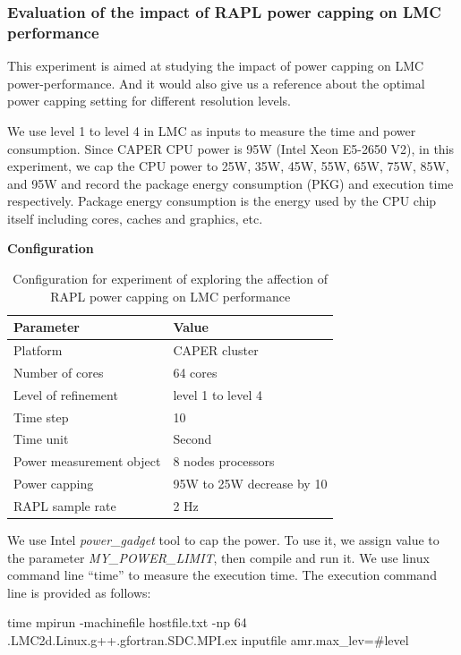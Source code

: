 \documentclass[10pt, conference, compsocconf]{IEEEtran}
\begin{document}
\subsubsection{Evaluation of the impact of RAPL power capping on LMC performance }
This experiment is aimed at studying the impact of power capping on LMC power-performance. And it would also give us a reference about the optimal power capping setting for different resolution levels. 



We use level 1 to level 4 in LMC as inputs to measure the time and power consumption. Since CAPER CPU power is 95W (Intel Xeon E5-2650 V2), in this experiment, we cap the CPU power to 25W, 35W, 45W, 55W, 65W, 75W, 85W, and 95W and record the package energy consumption (PKG) and execution time respectively. Package energy consumption is the energy used by the CPU chip itself including cores, caches and graphics, etc. 


\noindent
\textbf{Configuration}
\begin{table}[H]
\begin{center}
\begin{tabular}{|l|l|}
	\hline
	\textbf{Parameter} & \textbf{Value}\\ \hline
    Platform & CAPER cluster\\ 		\hline
    Number of cores & 64 cores\\
	\hline
    Level of refinement  & level 1 to level 4\\
    \hline
    Time step & 10\\
    \hline
    Time unit & Second\\
    \hline
    Power measurement object & 8 nodes processors\\
    \hline
    Power capping & 95W to 25W decrease by 10\\
    \hline
    RAPL sample rate & 2 Hz\\
    \hline
\end{tabular}
\end{center}
\caption{Configuration for experiment of exploring the affection of RAPL power capping on LMC performance 
}
\label{table:table_rapl_capping}
\end{table}

We use Intel \textit{power\_gadget} tool to cap the power. To use it, we assign value to the parameter \textit{MY\_POWER\_LIMIT}, then compile and run it.
We use linux command line ``time'' to measure the execution time. The execution command line is provided as follows:
\begin{adjustwidth}{2cm}{4cm}
time mpirun -machinefile hostfile.txt -np 64 .\/LMC2d.Linux.g++.gfortran.SDC.MPI.ex inputfile amr.max\_lev=\#level
\end{adjustwidth}
\end{document}
